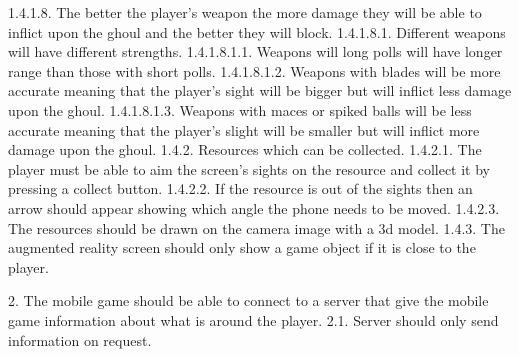 \documentclass{article}
\newcommand{\forceindent}{\leavevmode{\parindent=1em\indent}}
\begin{document}
		\forceindent \forceindent \forceindent 1.4.1.8. The better the player's weapon the more damage they will be able to inflict upon the ghoul and the better they will block.\newline
		\forceindent \forceindent \forceindent \forceindent 1.4.1.8.1. Different weapons will have different strengths.\newline
		\forceindent \forceindent \forceindent \forceindent \forceindent 1.4.1.8.1.1. Weapons will long polls will have longer range than those with short polls.\newline
		\forceindent \forceindent \forceindent \forceindent \forceindent 1.4.1.8.1.2. Weapons with blades will be more accurate meaning that the player's sight will be bigger but will inflict less damage upon the ghoul.\newline
		\forceindent \forceindent \forceindent \forceindent \forceindent 1.4.1.8.1.3. Weapons with maces or spiked balls will be less accurate meaning that the player's slight will be smaller but will inflict more damage upon the ghoul. \newline
		\forceindent \forceindent 1.4.2. Resources which can be collected. \newline
		\forceindent \forceindent \forceindent 1.4.2.1. The player must be able to aim the screen's sights on the resource and collect it by pressing a collect button. \newline
		\forceindent \forceindent \forceindent 1.4.2.2. If the resource is out of the sights then an arrow should appear showing which angle the phone needs to be moved.\newline
		\forceindent \forceindent \forceindent 1.4.2.3. The resources should be drawn on the camera image with a 3d model. \newline
		\forceindent \forceindent 1.4.3. The augmented reality screen should only show a game object if it is close to the player.\newline
		
		2.	The mobile game should be able to connect to a server that give the mobile game information about what is around the player.\newline
		\forceindent 2.1.	Server should only send information on request.\newline
		
\end{document}
